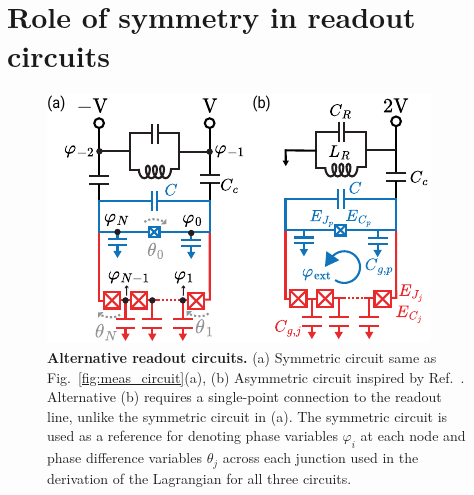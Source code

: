 \documentclass[%
reprint,
superscriptaddress,
 amsmath,amssymb,
 aps,
 prx,
longbibliography,
floatfix,
]{revtex4-2}
\begin{document}
\section{Role of symmetry in readout circuits}\label{app:alt_circuits}
\begin{figure}[t]
    \centering
    \includegraphics[width=\linewidth]{Supp_Fig/Circuit_choice.pdf}
    \caption{{\bf Alternative readout circuits.} (a) Symmetric circuit same as Fig.~\ref{fig:meas_circuit}(a), (b) Asymmetric circuit inspired by Ref.~\cite{zhang_universal_2021}. Alternative (b) requires a single-point connection to the readout line, unlike the symmetric circuit in (a). The symmetric circuit is used as a reference for denoting phase variables $\varphi_i$ at each node and phase difference variables $\theta_j$ across each junction used in the derivation of the Lagrangian for all three circuits.}
    \label{fig:circuit_choice}
\end{figure}
\end{document}
